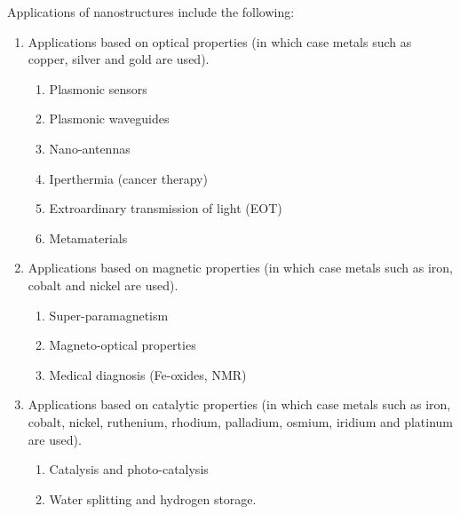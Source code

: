 Applications of nanostructures include the following:
\begin{enumerate}
\item Applications based on optical properties (in which case metals such as copper, silver and gold are used).
\begin{enumerate}
\item Plasmonic sensors
\item Plasmonic waveguides
\item Nano-antennas
\item Iperthermia (cancer therapy)
\item Extroardinary transmission of light (EOT)
\item Metamaterials
\end{enumerate}
\item Applications based on magnetic properties (in which case metals such as iron, cobalt and nickel are used).
\begin{enumerate}
\item Super-paramagnetism
\item Magneto-optical properties
\item Medical diagnosis (Fe-oxides, NMR)
\end{enumerate}
\item Applications based on catalytic properties (in which case metals such as iron, cobalt, nickel, ruthenium, rhodium, palladium, osmium, iridium and platinum are used).
\begin{enumerate}
\item Catalysis and photo-catalysis
\item Water splitting and hydrogen storage.
\end{enumerate}
\end{enumerate}

